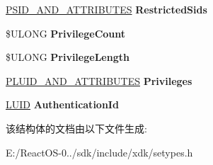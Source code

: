 \begin{DoxyCompactItemize}
\hyperlink{struct___s_i_d___a_n_d___a_t_t_r_i_b_u_t_e_s}{P\+S\+I\+D\+\_\+\+A\+N\+D\+\_\+\+A\+T\+T\+R\+I\+B\+U\+T\+ES} {\bfseries Restricted\+Sids}
\item 
\mbox{\label{struct___t_o_k_e_n___g_r_o_u_p_s___a_n_d___p_r_i_v_i_l_e_g_e_s_a890ad39145e61268333d39857fbd2eff}} 
\$U\+L\+O\+NG {\bfseries Privilege\+Count}
\item 
\mbox{\label{struct___t_o_k_e_n___g_r_o_u_p_s___a_n_d___p_r_i_v_i_l_e_g_e_s_a868b5f82573dc6c4aba3e7f2dabba7ff}} 
\$U\+L\+O\+NG {\bfseries Privilege\+Length}
\item 
\mbox{\label{struct___t_o_k_e_n___g_r_o_u_p_s___a_n_d___p_r_i_v_i_l_e_g_e_s_a781dbbc840988e4d880a413cc44b2a17}} 
\hyperlink{struct___l_u_i_d___a_n_d___a_t_t_r_i_b_u_t_e_s}{P\+L\+U\+I\+D\+\_\+\+A\+N\+D\+\_\+\+A\+T\+T\+R\+I\+B\+U\+T\+ES} {\bfseries Privileges}
\item 
\mbox{\label{struct___t_o_k_e_n___g_r_o_u_p_s___a_n_d___p_r_i_v_i_l_e_g_e_s_a9fe5c6d8322b172dab5bd1ac0487fcc5}} 
\hyperlink{struct___l_u_i_d}{L\+U\+ID} {\bfseries Authentication\+Id}
\end{DoxyCompactItemize}


该结构体的文档由以下文件生成\+:\begin{DoxyCompactItemize}
\item 
E\+:/\+React\+O\+S-\/0../sdk/include/xdk/setypes.\+h\end{DoxyCompactItemize}
